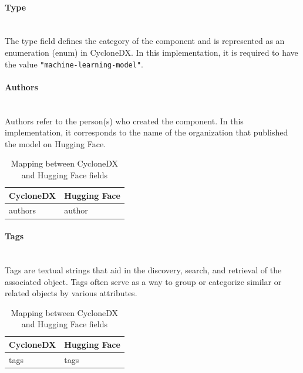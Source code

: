 \documentclass[12pt,a4paper, oneside, openright]{book}
\begin{document}
\paragraph{Type} \mbox{} \\
The type field defines the category of the component and is represented as an enumeration (enum) in CycloneDX. In this implementation, it is required to have the value \texttt{"machine-learning-model"}.

\paragraph{Authors} \mbox{} \\
Authors refer to the person(s) who created the component. In this implementation, it corresponds to the name of the organization that published the model on Hugging Face.
\begin{table}[h]
    \centering
    \begin{tabular}{|p{7cm}|p{6cm}|}
        \hline
        \textbf{CycloneDX} & \textbf{Hugging Face}\\ \hline
        authors & author  \\ \hline
    \end{tabular}
    \caption{Mapping between CycloneDX and Hugging Face fields}
    \label{tab:cyclonedx_huggingface}
\end{table}

\paragraph{Tags} \mbox{} \\
Tags are textual strings that aid in the discovery, search, and retrieval of the associated object. Tags often serve as a way to group or categorize
similar or related objects by various attributes.

\begin{table}[h!]
    \centering
    \begin{tabular}{|p{7cm}|p{6cm}|}
        \hline
        \textbf{CycloneDX} & \textbf{Hugging Face}\\ \hline
           tags    
           & tags
        \\ \hline

        
    \end{tabular}
\caption{Mapping between CycloneDX and Hugging Face fields}
    \label{tab:cyclonedx_huggingface}
\end{table}
\end{document}
